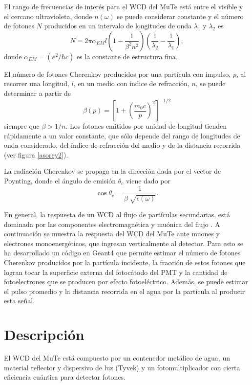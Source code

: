 \documentclass[12pt,oneside,openany,letter]{book}
\begin{document}
El rango de frecuencias de interés para el WCD del MuTe está entre el visible y el cercano ultravioleta, donde $n(\omega)$ se puede considerar constante y el número de fotones $N$ producidos en un intervalo de longitudes de onda $\lambda_1$ y $\lambda_2$ es
\begin{equation}
N = 2\pi \alpha_{EM} l \left( 1 - \frac{1}{\beta^2 n^2}\right)  \left(\frac{1}{\lambda_2} - \frac{1}{\lambda_1}\right),
\end{equation}
donde $\alpha_{EM}=(e^2/\hbar c)$ es la constante de estructura fina.

El número de fotones Cherenkov producidos por una partícula con impulso, $p$, al recorrer una longitud, $l$, en un medio con índice de refracción, $n$, se puede determinar a partir de 
\begin{equation}
\beta(p)= \left[1 + \left(\frac{m_0 c}{p}\right)^2 \right]^{-1/2}
\end{equation}
siempre que $\beta > 1/n$. Los fotones emitidos por unidad de longitud tienden rápidamente a un valor constante, que sólo depende del rango de longitudes de onda considerado, del índice de refracción del medio y de la distancia recorrida (ver figura \ref{asorey2}). 

La radiación Cherenkov se propaga en la dirección dada por el vector de Poynting, donde el ángulo de emisión $\theta_c$ viene dado por  
\begin{equation}
\label{angulo}
\cos \theta_c = \frac{1}{\beta \sqrt[]{\epsilon(\omega)}}.
\end{equation}

En general, la respuesta de un WCD al flujo de part\'iculas secundarias, est\'a dominada por las componentes electromagnética y muónica del flujo \cite{Asorey-phd2012}. A continuaci\'on se muestra la respuesta del WCD del MuTe ante muones y electrones monoenergéticos, que ingresan verticalmente al detector. Para esto se ha desarrollado un código en Geant4 que permite estimar el número de fotones Cherenkov producidos por la partícula incidente, la fracción de estos fotones que logran tocar la superficie externa del fotoc\'atodo del PMT y la cantidad de fotoelectrones que se producen por efecto fotoeléctrico. Además, se puede estimar el pulso promedio y la distancia recorrida en el agua por la partícula al producir esta señal.


\section{Descripción}
El WCD del MuTe está compuesto por un contenedor metálico de agua, un material reflector y dispersivo de luz (Tyvek) y un fotomultiplicador con cierta eficiencia cuántica para detectar fotones.
\end{document}
